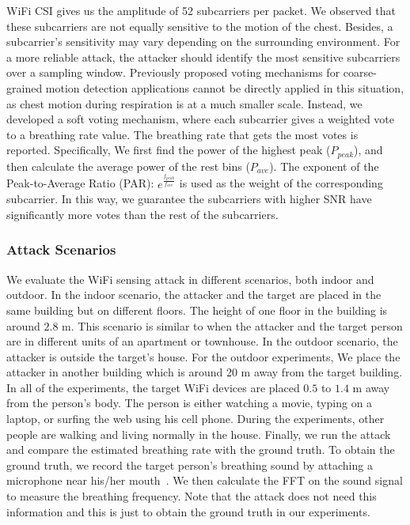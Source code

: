WiFi CSI gives us the amplitude of 52 subcarriers per packet. We observed that these subcarriers are not equally sensitive to the motion of the chest. Besides, a subcarrier's sensitivity may vary depending on the surrounding environment. For a more reliable attack, the attacker should identify the most sensitive subcarriers over a sampling window. Previously proposed voting mechanisms for coarse-grained motion detection applications \cite{zhu2018tu,  Arshad17,MoSense,WiGest} cannot be directly applied in this situation, as chest motion during respiration is at a much smaller scale. Instead, we developed a soft voting mechanism, where each subcarrier gives a weighted vote to a breathing rate value. The breathing rate that gets the most votes is reported.  Specifically, We first find the power of the highest peak ($P_{peak}$), and then calculate the average power of the rest bins ($P_{ave}$). The exponent of the Peak-to-Average Ratio (PAR): $e^{\frac{f_{peak}}{f_{ave}}}$ is used as the weight of the corresponding subcarrier. In this way, we guarantee the subcarriers with higher SNR have significantly more votes than the rest of the subcarriers. 


\subsubsection{Attack Scenarios}
We evaluate the WiFi sensing attack in different scenarios, both indoor and outdoor. In the indoor scenario, the attacker and the target are placed in the same building but on different floors. The height of one floor in the building is around $2.8$ m.  This scenario is similar to when the attacker and the target person are in different units of an apartment or townhouse.
In the outdoor scenario, the attacker is outside the target's house. For the outdoor experiments, We place the attacker in another building which is around 20 m away from the target building. In all of the experiments, the target WiFi devices are placed $0.5$ to $1.4$ m away from the person's body. The person is either watching a movie, typing on a laptop, or surfing the web using his cell phone. During the experiments, other people are walking and living normally in the house. Finally, we run the attack and compare the estimated breathing rate with the ground truth.
To obtain the ground truth, we record the target person's breathing sound by attaching a microphone near his/her mouth~\cite{dafna2015sleep}. We then calculate the FFT on the sound signal to measure the breathing frequency. Note that the attack does not need this information and this is just to obtain the ground truth in our experiments.

